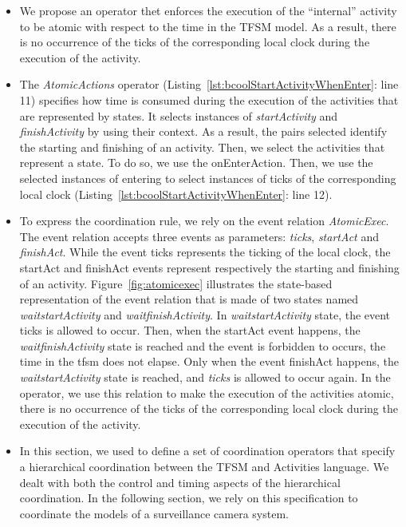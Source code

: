 \begin{itemize}
	\item We propose an operator thet enforces the execution of the ``internal'' activity to be atomic with respect to the time in the TFSM model. As a result, there is no occurrence of the \dse ticks of the corresponding local clock during the execution of the activity.
	
	
	\item The \emph{AtomicActions} operator (Listing~\ref{lst:bcoolStartActivityWhenEnter}: line 11) specifies how time is consumed during the execution of the activities that are represented by states. It selects instances of \dse \emph{startActivity} and \emph{finishActivity} by using their context. As a result, the pairs selected identify the starting and finishing of an activity. Then, we select the activities that represent a state. To do so, we use the onEnterAction. Then, we use the selected instances of \dse entering to select instances of \dse ticks of the corresponding local clock (Listing~\ref{lst:bcoolStartActivityWhenEnter}: line 12). 
	
	\item To express the coordination rule, we rely on the event relation \emph{AtomicExec}. The event relation accepts three events as parameters: \emph{ticks}, \emph{startAct} and \emph{finishAct}. While the event ticks represents the ticking of the local clock, the startAct and finishAct events represent respectively the starting and finishing of an activity. Figure~\ref{fig:atomicexec} illustrates the state-based representation of the event relation that is made of two states named \emph{waitstartActivity} and \emph{waitfinishActivity}. In \emph{waitstartActivity} state, the event ticks is allowed to occur. Then, when the startAct event happens, the \emph{waitfinishActivity} state is reached and the event is forbidden to occurs, \ie the time in the tfsm does not elapse. Only when the event finishAct happens, the \emph{waitstartActivity} state is reached, and \emph{ticks} is allowed to occur again. In the operator, we use this relation to make the execution of the activities atomic, \ie there is no occurrence of the \dse ticks of the corresponding local clock during the execution of the activity.
	
	\item In this section, we used \bcool to define a set of coordination operators that specify a hierarchical coordination between the TFSM and Activities language. We dealt with both the control and timing aspects of the hierarchical coordination. In the following section, we rely on this \bcool specification to coordinate the models of a surveillance camera system.
\end{itemize}


